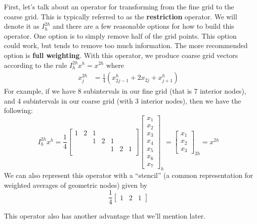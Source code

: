 \documentclass[11pt]{article}
\begin{document}
First, let's talk about an operator for transforming from the fine grid
to the coarse grid. This is typically referred to as the
\textbf{restriction} operator. We will denote it as \(I_h^{2h}\) and
there are a few reasonable options for how to build this operator. One
option is to simply remove half of the grid points. This option could
work, but tends to remove too much information. The more recommended
option is \textbf{full weighting}. With this operator, we produce coarse
grid vectors according to the rule \(I_{h}^{2h} x^{h} = x^{2h}\) where
\begin{align*}
x_{j}^{2h} &= \frac{1}{4} \left( x_{2j-1}^{h} + 2x_{2j} + x_{j+1}^{h} \right)
\end{align*} For example, if we have 8 subintervals in our fine grid
(that is 7 interior nodes), and 4 subintervals in our coarse grid (with
3 interior nodes), then we have the following: \[
I_{h}^{2h} x^{h} = \frac{1}{4} 
\begin{bmatrix}
1 & 2 & 1 &   &   &   & \\
  &   & 1 & 2 & 1 &   & \\
  &   &   &   & 1 & 2 & 1 \\
\end{bmatrix}
\begin{bmatrix}
x_1 \\ x_2 \\ x_3 \\ x_4 \\ x_5 \\ x_6 \\ x_7
\end{bmatrix}_{h}
= \begin{bmatrix}
x_1 \\ x_2 \\ x_3
\end{bmatrix}_{2h} = x^{2h}
\] We can also represent this operator with a ``stencil'' (a common
representation for weighted averages of geometric nodes) given by \[
\frac{1}{4} \begin{bmatrix} 1 & 2 & 1 \end{bmatrix}
\]

This operator also has another advantage that we'll mention later.
\end{document}
